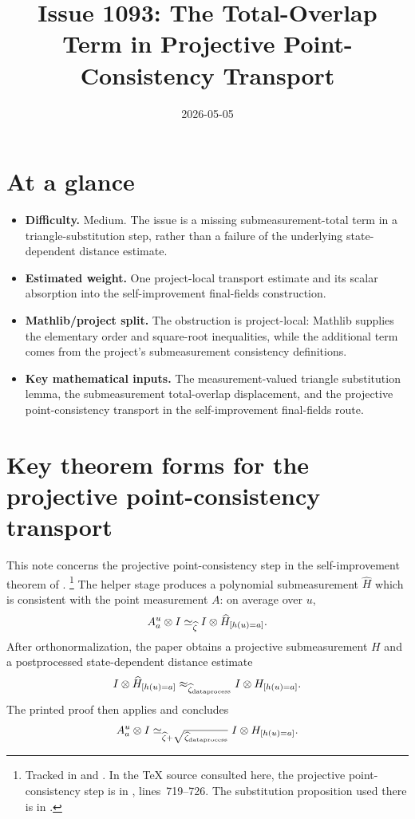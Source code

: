 \documentclass[11pt]{article}
\title{Issue 1093: The Total-Overlap Term in Projective Point-Consistency Transport}
\author{}
\date{2026-05-05}
\begin{document}
\maketitle

\section{At a glance}

\begin{itemize}
  \item \textbf{Difficulty.} Medium.  The issue is a missing
  submeasurement-total term in a triangle-substitution step, rather than a
  failure of the underlying state-dependent distance estimate.
  \item \textbf{Estimated weight.} One project-local transport estimate and its
  scalar absorption into the self-improvement final-fields construction.
  \item \textbf{Mathlib/project split.} The obstruction is project-local:
  Mathlib supplies the elementary order and square-root inequalities, while the
  additional term comes from the project's submeasurement consistency
  definitions.
  \item \textbf{Key mathematical inputs.} The measurement-valued triangle
  substitution lemma, the submeasurement total-overlap displacement, and the
  projective point-consistency transport in the self-improvement final-fields
  route.
\end{itemize}

\section{Key theorem forms for the projective point-consistency transport}

This note concerns the projective point-consistency step in the
self-improvement theorem of \cite[Section~9]{Ji2020LowIndividualDegree}.%
\footnote{Tracked in  and .  In the TeX source
consulted here, the projective point-consistency step is in
, lines~719--726.  The
substitution proposition used there is  in
.}
The helper stage produces a polynomial submeasurement $\widehat H$ which is
consistent with the point measurement $A$: on average over $u$,
\[
  A^u_a \otimes I \simeq_{\widehat \zeta}
  I \otimes \widehat H_{[h(u)=a]}.
\]
After orthonormalization, the paper obtains a projective submeasurement $H$ and
a postprocessed state-dependent distance estimate
\[
  I \otimes \widehat H_{[h(u)=a]}
  \approx_{\widehat \zeta_{\mathrm{dataprocess}}}
  I \otimes H_{[h(u)=a]}.
\]
The printed proof then applies  and concludes
\[
  A^u_a \otimes I \simeq_{\widehat \zeta +
    \sqrt{\widehat \zeta_{\mathrm{dataprocess}}}}
  I \otimes H_{[h(u)=a]}.
\]
\end{document}
